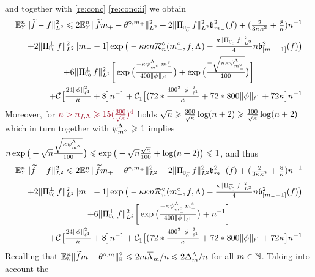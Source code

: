 \begin{pro}
\begin{multline*}
 \end{multline*}
and together with \cref{re:conc} \ref{re:conc:ii} we obtain
\begin{multline*}
\FuEx[\ssY]{\rY}\VnormLp{\txdf-\xdf}^2\leq 2\FuEx[\ssY]{\rY}\VnormLp{\txdfPr[\pDi]-\xdfPr[\pDi]}^2+2\VnormLp{\Proj[{\mHiH[0]^\perp}]\xdf}^2\bias[\mDi]^2(\xdf)+(\tfrac{2}{3\cpen\rWc^{2}}+ \tfrac{8}{\rWc})\ssY^{-1}\\\hfill
\hfill+2\VnormLp{\Proj[{\mHiH[0]}]^\perp\xdf}^2\,[\mDi-1]\exp\big(-\rWc\cpen\ssY\hRa{\mdDi,\xdf,\iSv}-
    \tfrac{\rWc\VnormLp{\Proj[{\mHiH[0]}]^\perp\xdf}^2}{4}\ssY\bias[{[\mDi-1]}]^2(\xdf)\big)
\\
+6\VnormLp{\Proj[{\mHiH[0]}]^\perp\xdf}^2 \bigg[\exp\big(\tfrac{-\cpen\cmSv[\mdDi]\mdDi}{400\Vnormlp[1]{\fydf}}\big)
+\exp\big(\tfrac{-\sqrt{n\cpen\cmSv[\mdDi]}}{100}\big)\bigg]\\\hfill
+\cst{}\big[\tfrac{24\Vnormlp[1]{\fydf}^2}{\cpen}+8\big]\ssY^{-1}
+ \cst{1}\big[
(72*\tfrac{400^2\Vnormlp[1]{\fydf}^2}{\cpen}+72*800\Vnormlp[1]{\fydf}
+ 72\cpen\big]\ssY^{-1}
 \end{multline*}
Moreover, for $\dr \ssY>
\ssY_{\xdf,\iSv}\geq 15(\tfrac{300}{\sqrt{\cpen}})^4$  holds
$\sqrt{n}\geq \tfrac{300}{\sqrt{\cpen}}\log(\ssY+2)\geq\tfrac{100}{\sqrt{\cpen}}\log(\ssY+2)$ which in turn
together with $\cmiSv[\mdDi]\geq1$ implies
$\ssY\exp\big(-\sqrt{\ssY}\tfrac{\sqrt{\cpen\cmiSv[\mdDi]}}{100}\big)\leq\exp\big(-\sqrt{\ssY}\tfrac{\sqrt{\cpen}}{100}+\log(\ssY+2)\big)\leq1$,
and thus 
\begin{multline*}
\FuEx[\ssY]{\rY}\VnormLp{\txdf-\xdf}^2\leq 2\FuEx[\ssY]{\rY}\VnormLp{\txdfPr[\pDi]-\xdfPr[\pDi]}^2+2\VnormLp{\Proj[{\mHiH[0]^\perp}]\xdf}^2\bias[\mDi]^2(\xdf)+(\tfrac{2}{3\cpen\rWc^{2}}+ \tfrac{8}{\rWc})\ssY^{-1}\\\hfill
\hfill+2\VnormLp{\Proj[{\mHiH[0]}]^\perp\xdf}^2\,[\mDi-1]\exp\big(-\rWc\cpen\ssY\hRa{\mdDi,\xdf,\iSv}-
    \tfrac{\rWc\VnormLp{\Proj[{\mHiH[0]}]^\perp\xdf}^2}{4}\ssY\bias[{[\mDi-1]}]^2(\xdf)\big)
\\
+6\VnormLp{\Proj[{\mHiH[0]}]^\perp\xdf}^2 \bigg[\exp\big(\tfrac{-\cpen\cmSv[\mdDi]\mdDi}{400\Vnormlp[1]{\fydf}}\big)
+\ssY^{-1}\bigg]\\\hfill
+\cst{}\big[\tfrac{24\Vnormlp[1]{\fydf}^2}{\cpen}+8\big]\ssY^{-1}
+ \cst{1}\big[
(72*\tfrac{400^2\Vnormlp[1]{\fydf}^2}{\cpen}+72*800\Vnormlp[1]{\fydf}
+ 72\cpen\big]\ssY^{-1}
 \end{multline*}
Recalling that $\FuEx[\ssY]{\ydf}\VnormH{\txdfPr-\xdfPr}^2\leq2\Di\oiSv/\ssY\leq
  2\DipenSv/\ssY$ for all $\Di\in\Nz$. Taking into account the

\end{pro}
